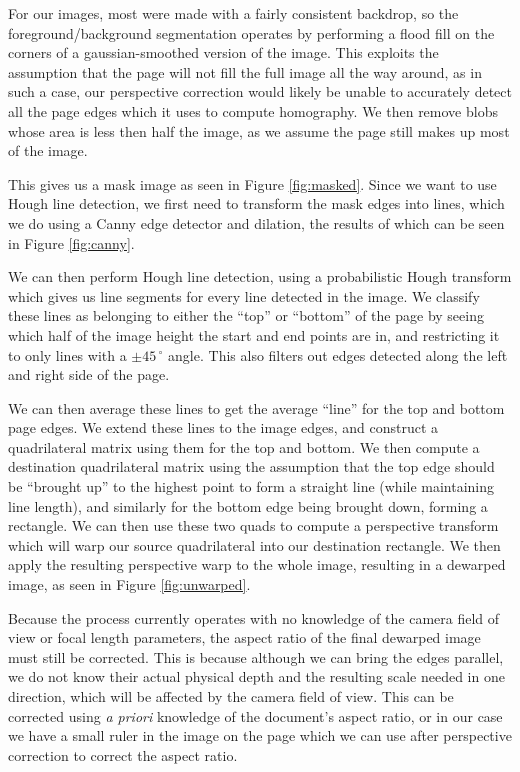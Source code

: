 \documentclass[a4paper]{llncs}
\begin{document}
For our images, most were made with a fairly consistent backdrop, so the foreground/background segmentation operates by performing a flood fill on the corners of a gaussian-smoothed version of the image. This exploits the assumption that the page will not fill the full image all the way around, as in such a case, our perspective correction would likely be unable to accurately detect all the page edges which it uses to compute homography. We then remove blobs whose area is less then half the image, as we assume the page still makes up most of the image. 

This gives us a mask image as seen in Figure \ref{fig:masked}. Since we want to use Hough line detection, we first need to transform the mask edges into lines, which we do using a Canny edge detector and dilation, the results of which can be seen in Figure \ref{fig:canny}.

We can then perform Hough line detection, using a probabilistic Hough transform which gives us line segments for every line detected in the image. We classify these lines as belonging to either the “top” or “bottom” of the page by seeing which half of the image height the start and end points are in, and restricting it to only lines with a $\pm 45\,^{\circ}$ angle. This also filters out edges detected along the left and right side of the page.

We can then average these lines to get the average “line” for the top and bottom page edges. We extend these lines to the image edges, and construct a quadrilateral matrix using them for the top and bottom. We then compute a destination quadrilateral matrix using the assumption that the top edge should be “brought up” to the highest point to form a straight line (while maintaining line length), and similarly for the bottom edge being brought down, forming a rectangle. We can then use these two quads to compute a perspective transform which will warp our source quadrilateral into our destination rectangle. We then apply the resulting perspective warp to the whole image, resulting in a dewarped image, as seen in Figure \ref{fig:unwarped}.

Because the process currently operates with no knowledge of the camera field of view or focal length parameters,
the aspect ratio of the final dewarped image must still be corrected. This is because although we can bring the
edges parallel, we do not know their actual physical depth and the resulting scale needed in one direction,
which will be affected by the camera field of view. This can be corrected using \emph{a priori} knowledge of the
document's aspect ratio, or in our case we have a small ruler in the image on the page
which we can use after perspective correction to correct the aspect ratio.
\end{document}
